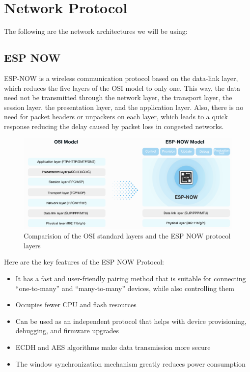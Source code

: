 \section{Network Protocol}
The following are the network architectures we will be using:
\subsection{ESP NOW}
ESP-NOW is a wireless communication protocol based on the data-link layer, which reduces the five layers of the OSI model to only one. This way, the data need not be transmitted through the network layer, the transport layer, the session layer, the presentation layer, and the application layer. Also, there is no need for packet headers or unpackers on each layer, which leads to a quick response reducing the delay caused by packet loss in congested networks. 
\begin{figure}[H]
    \centering
    \includegraphics[width=0.75\linewidth]{Files/Images/model-en.png}
    \caption{Comparision of the OSI standard layers and the ESP NOW protocol layers}
    \label{fig:enter-label}
\end{figure}
Here are the key features of the ESP NOW Protocol:
\begin{itemize}
    \item It has a fast and user-friendly pairing method that is suitable for connecting “one-to-many” and “many-to-many” devices, while also controlling them
    \item Occupies fewer CPU and flash resources
    \item Can be used as an independent protocol that helps with device provisioning, debugging, and firmware upgrades
    \item  ECDH and AES algorithms make data transmission more secure
    \item The window synchronization mechanism greatly reduces power consumption
\end{itemize}
